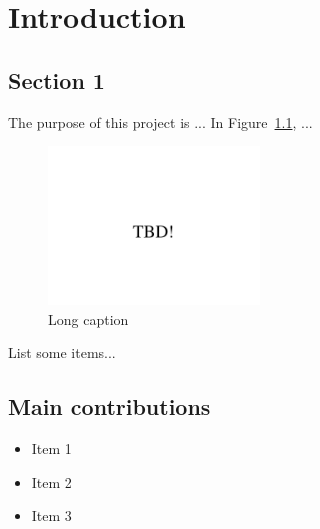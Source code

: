 \chapter{Introduction}
\label{intro} 

\section{Section 1}
\label{sec1}
The purpose of this project is ... In Figure~\ref{fig:tbd}, ...

\begin{figure}[!ht]
\centering
\includegraphics[viewport= 240 200 440 290, clip, width=0.5\textwidth]{pictures/tbd}
\caption[Short caption]{Long caption}
\label{fig:tbd}
\end{figure}

List some items...

\renewcommand{\labelitemi}{\normalfont\textbf{\cdot}}
\renewcommand{\labelitemii}{\normalfont\textperiodcentered}

\section{Main contributions}
\label{maincontr}
\begin{itemize}
	\item Item 1
	\item Item 2
	\item Item 3
\end{itemize}

\renewcommand{\labelitemi}{\normalfont\textendash}
\renewcommand{\labelitemii}{\normalfont\textperiodcentered}
